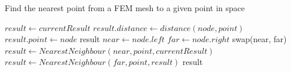 \begin{algorithm}[H]
\centering
\caption{Find the nearest point from a FEM mesh to a given point in space}\label{alg:nearest-neighbour}
\begin{algorithmic}[1]
			\State $result \gets currentResult$
						\State $result.distance \gets distance(node, point)$
						\State $result.point \gets node$
					\EndIf
				\EndFor
			\EndFor
			\State \Return result
		\EndIf
		\State$near \gets node.left$
		\State$far  \gets node.right$
			\State swap(near, far)
		\EndIf
		\State $result \gets NearestNeighbour(near, point, currentResult)$
			\State $result \gets NearestNeighbour(far, point, result)$
		\EndIf
		\State \Return result
	\EndProcedure
\end{algorithmic}
\end{algorithm}

